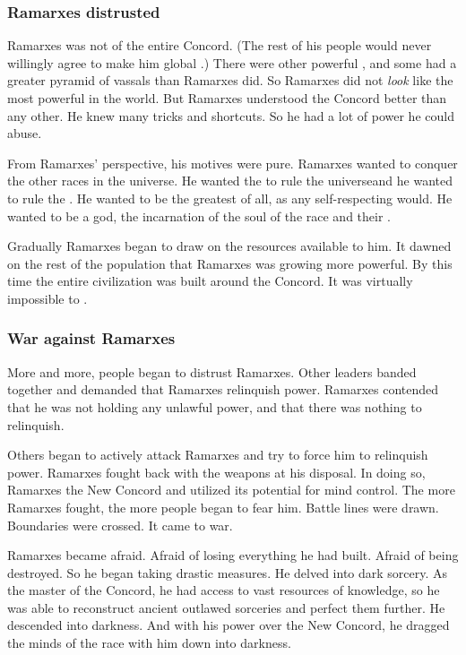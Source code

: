 \subsubsection{Ramarxes distrusted}
Ramarxes was not \apex of the entire Concord. 
(The rest of his people would never willingly agree to make him global \apex.)
There were other powerful \apexes, and some had a greater pyramid of vassals than Ramarxes did. 
So Ramarxes did not \emph{look} like the most powerful \caisith in the world.
But Ramarxes understood the Concord better than any other.
He knew many tricks and shortcuts.
So he had a lot of power he could abuse. 

From Ramarxes' perspective, his motives were pure. 
Ramarxes wanted to conquer the other races in the universe. 
He wanted the \caisith to rule the universe\dash and he wanted to rule the \caisith.
He wanted to be the greatest of all, as any self-respecting \caisith would. 
He wanted to be a god, the incarnation of the soul of the \caisith race and their . 

Gradually Ramarxes began to draw on the resources available to him.
It dawned on the rest of the population that Ramarxes was growing more powerful.
By this time the entire \caisith civilization was built around the Concord.
It was virtually impossible to . 





\subsubsection{War against Ramarxes}
More and more, people began to distrust Ramarxes. 
Other leaders banded together and demanded that Ramarxes relinquish power.
Ramarxes contended that he was not holding any unlawful power, and that there was nothing to relinquish.

Others began to actively attack Ramarxes and try to force him to relinquish power.
Ramarxes fought back with the weapons at his disposal. 
In doing so, Ramarxes  the New Concord and utilized its potential for mind control. 
The more Ramarxes fought, the more people began to fear him.
Battle lines were drawn. 
Boundaries were crossed.
It came to war. 

Ramarxes became afraid. 
Afraid of losing everything he had built.
Afraid of being destroyed. 
So he began taking drastic measures.
He delved into dark sorcery. 
As the master of the Concord, he had access to vast resources of knowledge, so he was able to reconstruct ancient outlawed sorceries and perfect them further. 
He descended into darkness. 
And with his power over the New Concord, he dragged the minds of the \caisith race with him down into darkness. 

